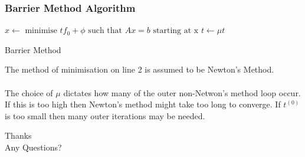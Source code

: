 \documentclass{beamer}
\def\rnum{\mathbb{R}}
\begin{document}
\begin{frame}
    \frametitle{Barrier Method Algorithm}
    \begin{algorithm}[H]
        \begin{algorithmic}[1]
            \STATE $x \leftarrow \text{ minimise } tf_{0} + \phi
            \text{ such that } Ax = b \text{ starting at x}$
            \STATE $t \leftarrow \mu t$
            \ENDWHILE
        \end{algorithmic}
        \caption{Barrier Method}
        \label{alg:seq}
    \end{algorithm}
    The method of minimisation on line 2 is assumed to be Newton's Method.
    \\~\\
    The choice of $\mu$ dictates how many of the outer non-Netwon's method loop
    occur. If this is too high then Newton's method might take too long to
    converge. If $t^{(0)}$ is too small then many outer iterations may be
    needed.
\end{frame}


\begin{frame}
    \centering
    Thanks \\
    Any Questions?
\end{frame}


\end{document}
